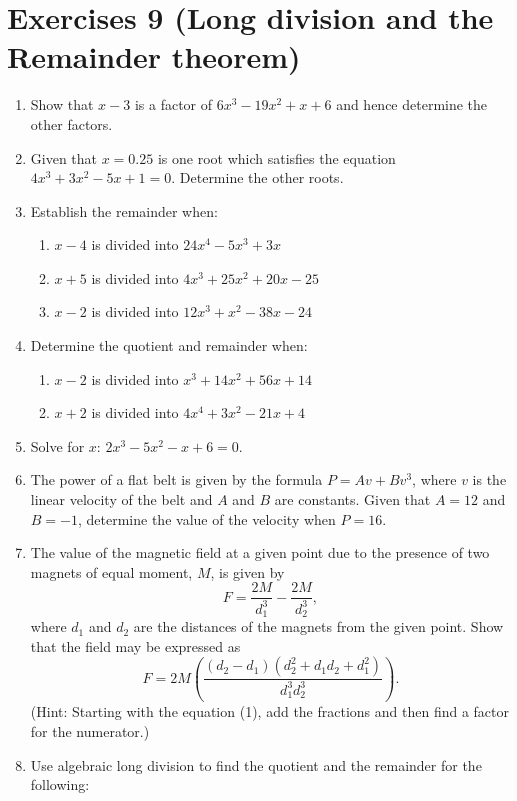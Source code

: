 \documentclass[
  english,
  12pt,
  oneside]{book}
\providecommand{\tightlist}{%
  \setlength{\itemsep}{0pt}\setlength{\parskip}{0pt}}
\theoremstyle{definition}
\theoremstyle{definition}
\theoremstyle{definition}
\theoremstyle{definition}
\theoremstyle{remark}
\begin{document}
\chapter*{Exercises 9 (Long division and the Remainder theorem)}\label{exercises-9-long-division-and-the-remainder-theorem}

\begin{enumerate}
\def\labelenumi{\arabic{enumi}.}
\item
  Show that \(x - 3\) is a factor of \(6x^3 - 19x^2 + x + 6\) and hence determine the other factors.
\item
  Given that \(x = 0.25\) is one root which satisfies the equation \(4x^3 + 3x^2 - 5x + 1 = 0\). Determine the other roots.
\item
  Establish the remainder when:

  \begin{enumerate}
  \def\labelenumii{\roman{enumii})}
  \tightlist
  \item
    \(x - 4\) is divided into \(24x^4 - 5x^3 + 3x\)
  \item
    \(x + 5\) is divided into \(4x^3 + 25x^2 + 20x - 25\)
  \item
    \(x - 2\) is divided into \(12x^3 + x^2 - 38x - 24\)
  \end{enumerate}
\item
  Determine the quotient and remainder when:

  \begin{enumerate}
  \def\labelenumii{\roman{enumii})}
  \tightlist
  \item
    \(x - 2\) is divided into \(x^3 + 14x^2 + 56x + 14\)
  \item
    \(x + 2\) is divided into \(4x^4 + 3x^2 - 21x + 4\)
  \end{enumerate}
\item
  Solve for \(x\): \(2x^3-5x^2-x+6=0\).
\item
  The power of a flat belt is given by the formula \(P = Av + Bv^3\), where \(v\) is the linear velocity of the belt and \(A\) and \(B\) are constants. Given that \(A = 12\) and \(B = -1\), determine the value of the velocity when \(P = 16\).
\item
  The value of the magnetic field at a given point due to the presence of two magnets of equal moment, \(M\), is given by
  \[F=\frac{2M}{d_1^3}-\frac{2M}{d_2^3}, \tag{1}\]
  where \(d_1\) and \(d_2\) are the distances of the magnets from the given point. Show that the field may be expressed as
  \[F=2M\left(\frac{(d_2-d_1)(d_2^2+d_1d_2+d_1^2)}{d_1^3d_2^3}\right). \tag{2}\]
  (Hint: Starting with the equation (1), add the fractions and then find a factor for the numerator.)
\item
  Use algebraic long division to find the quotient and the remainder for the following:


\end{enumerate}
\end{document}
